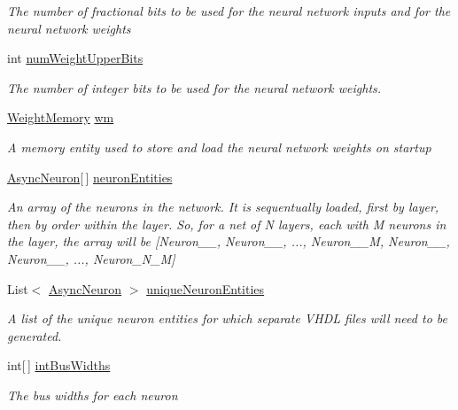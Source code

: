 \begin{DoxyCompactItemize}
\begin{DoxyCompactList}\small\item\em The number of fractional bits to be used for the neural network inputs and for the neural network weights \end{DoxyCompactList}\item 
int \hyperlink{class_n_n_gen_1_1_async_neural_network_a098bee8b58e461ea1141e5a2c165ee88}{num\+Weight\+Upper\+Bits}
\begin{DoxyCompactList}\small\item\em The number of integer bits to be used for the neural network weights. \end{DoxyCompactList}\item 
\hyperlink{class_n_n_gen_1_1_weight_memory}{Weight\+Memory} \hyperlink{class_n_n_gen_1_1_async_neural_network_a94241380da2839193000b7c3e78fe8cd}{wm}
\begin{DoxyCompactList}\small\item\em A memory entity used to store and load the neural network weights on startup \end{DoxyCompactList}\item 
\hyperlink{class_n_n_gen_1_1_async_neuron}{Async\+Neuron}\mbox{[}$\,$\mbox{]} \hyperlink{class_n_n_gen_1_1_async_neural_network_aeaec2eb4cfb3a7dba9c40d04c2fe7fb1}{neuron\+Entities}
\begin{DoxyCompactList}\small\item\em An array of the neurons in the network. It is sequentually loaded, first by layer, then by order within the layer. So, for a net of N layers, each with M neurons in the layer, the array will be \mbox{[}Neuron\+\_\+\_, Neuron\+\_\+\_, ..., Neuron\+\_\+\_\+\+M, Neuron\+\_\+\_, Neuron\+\_\+\_, ..., Neuron\+\_\+\+N\+\_\+\+M\mbox{]} \end{DoxyCompactList}\item 
List$<$ \hyperlink{class_n_n_gen_1_1_async_neuron}{Async\+Neuron} $>$ \hyperlink{class_n_n_gen_1_1_async_neural_network_a0f6322f9b2736a40e4f63b3107f8981d}{unique\+Neuron\+Entities}
\begin{DoxyCompactList}\small\item\em A list of the unique neuron entities for which separate V\+H\+D\+L files will need to be generated. \end{DoxyCompactList}\item 
int\mbox{[}$\,$\mbox{]} \hyperlink{class_n_n_gen_1_1_async_neural_network_a545f2bfc72b27d96c054de93d82a7571}{int\+Bus\+Widths}
\begin{DoxyCompactList}\small\item\em The bus widths for each neuron \end{DoxyCompactList}\end{DoxyCompactItemize}


